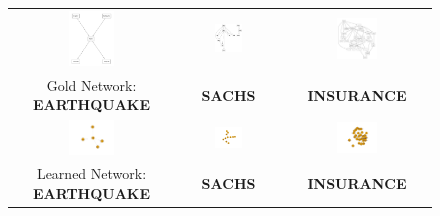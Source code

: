 \documentclass[runningheads]{llncs}
\begin{document}
\begin{figure}[H]
\begin{tabular}{ccc}
		\includegraphics[width=0.3\textwidth]{IMG/G3.png} &
		\includegraphics[width=0.3\textwidth]{IMG/G4.png} &
		\includegraphics[width=0.3\textwidth]{IMG/G7.png} \\
		Gold Network: \textbf{EARTHQUAKE} & \textbf{SACHS} & \textbf{INSURANCE} \\
		\includegraphics[width=0.3\textwidth]{IMG/4gr.png} &
		\includegraphics[width=0.3\textwidth]{IMG/5gr.png} &
		\includegraphics[width=0.3\textwidth]{IMG/6gr.png} \\
		Learned Network: \textbf{EARTHQUAKE} & \textbf{SACHS} & \textbf{INSURANCE} \\
		

\end{tabular}
\end{figure}
\end{document}
